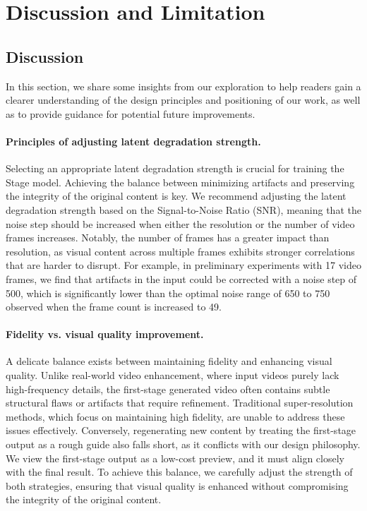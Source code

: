 \section{Discussion and Limitation}

\subsection{Discussion} 

In this section, we share some insights from our exploration to help readers gain a clearer understanding of the design principles and positioning of our work, as well as to provide guidance for potential future improvements.


\paragraph{Principles of adjusting latent degradation strength.} Selecting an appropriate latent degradation strength is crucial for training the Stage  model. Achieving the balance between minimizing artifacts and preserving the integrity of the original content is key. We recommend adjusting the latent degradation strength based on the Signal-to-Noise Ratio (SNR), meaning that the noise step should be increased when either the resolution or the number of video frames increases. Notably, the number of frames has a greater impact than resolution, as visual content across multiple frames exhibits stronger correlations that are harder to disrupt. For example, in preliminary experiments with 17 video frames, we find that artifacts in the input could be corrected with a noise step of 500, which is significantly lower than the optimal noise range of 650 to 750 observed when the frame count is increased to 49.


\paragraph{Fidelity vs. visual quality improvement.} A delicate balance exists between maintaining fidelity and enhancing visual quality. Unlike real-world video enhancement, where input videos purely lack high-frequency details, the first-stage generated video often contains subtle structural flaws or artifacts that require refinement. Traditional super-resolution methods, which focus on maintaining high fidelity, are unable to address these issues effectively. Conversely, regenerating new content by treating the first-stage output as a rough guide also falls short, as it conflicts with our design philosophy. We view the first-stage output as a low-cost preview, and it must align closely with the final result. To achieve this balance, we carefully adjust the strength of both strategies, ensuring that visual quality is enhanced without compromising the integrity of the original content.


